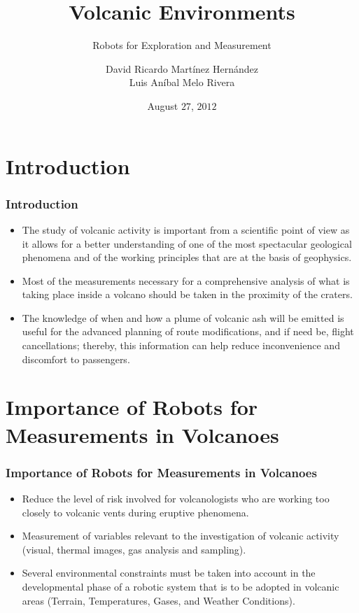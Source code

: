 \documentclass[xcolor=svgnames]{beamer}
\title{Volcanic Environments}
\subtitle{Robots for Exploration and Measurement}
\author[David Martínez y Luis Melo]{David Ricardo Martínez Hernández \\ Luis Aníbal Melo Rivera}
\institute[UNAL]{Faculty of Engineer\\ Department of Electric and Electronic \\ National University Of Colombia}
\date[08/27/2012]{August $27$, $2012$}
\begin{document}
\begin{frame}
\titlepage
\end{frame}

\begin{frame}
\tableofcontents
\end{frame}

\section{Introduction}
\begin{frame}
  \frametitle{Introduction}
    \begin{itemize}
   \item The study of volcanic activity is important from a scientific point of view as it allows for a better understanding of one of the most spectacular geological phenomena and of the working principles that are at the basis of geophysics. \pause
   \item Most of the measurements necessary for a comprehensive analysis of what is taking place inside a volcano should be taken in the proximity of the craters. \pause
   \item The knowledge of when and how a plume of volcanic ash will be emitted is useful for the advanced planning of route modifications, and if need be, flight cancellations; thereby, this information can help reduce inconvenience and discomfort to passengers.
  \end{itemize}
\end{frame}

\section{Importance of Robots for Measurements in Volcanoes}
\begin{frame}
\frametitle{Importance of Robots for Measurements in Volcanoes}
  \begin{itemize}
   \item Reduce the level of risk involved for volcanologists who are working too closely to volcanic vents during eruptive phenomena.\pause
   \item Measurement of variables relevant to the investigation of volcanic activity (visual, thermal images, gas analysis and sampling). \pause
   \item Several environmental constraints must be taken into account in the developmental phase of a robotic system that is to be adopted in volcanic areas (Terrain, Temperatures, Gases, and Weather Conditions).
  \end{itemize}
\end{frame}
\end{document}
